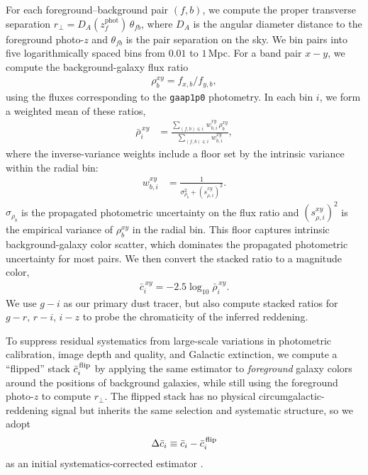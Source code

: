 \documentclass[linenumbers, twocolumn]{aastex701}
\begin{document}
For each foreground--background pair $(f, b)$, we compute the proper transverse separation $r_\perp = D_A(z_f^\text{phot})\,\theta_{fb}$, where $D_A$ is the angular diameter distance to the foreground photo-$z$ and $\theta_{fb}$ is the pair separation on the sky.
We bin pairs into five logarithmically spaced bins from $0.01$ to $1$\,Mpc.
For a band pair $x-y$, we compute the background-galaxy flux ratio
\begin{align}
    \rho_b^{xy} = f_{x,b} / f_{y,b},
\end{align}
using the fluxes corresponding to the \texttt{gaap1p0} photometry.
In each bin $i$, we form a weighted mean of these ratios,
\begin{align}
    \bar{\rho}^{\,xy}_i &=
        \frac{\sum_{(f,b) \in i}\, w^{xy}_{b,i}\,\rho_b^{xy}}{\sum_{(f,b) \in i}\, w^{xy}_{b,i}},
\end{align}
where the inverse-variance weights include a floor set by the intrinsic variance within the radial bin:
\begin{align}
    w^{xy}_{b,i} &=
        \frac{1}{\sigma^2_{\rho_b} + (s^{xy}_{\rho,i})^2}.
\end{align}
$\sigma_{\rho_b}$ is the propagated photometric uncertainty on the flux ratio and $(s^{xy}_{\rho,i})^2$ is the empirical variance of $\rho^{xy}_b$ in the radial bin.
This floor captures intrinsic background-galaxy color scatter, which dominates the propagated photometric uncertainty for most pairs.
We then convert the stacked ratio to a magnitude color,
\begin{align}
    \bar{c}^{\,xy}_i = -2.5 \log_{10} \bar{\rho}^{\,xy}_i .
\end{align}
We use $g-i$ as our primary dust tracer, but also compute stacked ratios for $g-r,\, r-i,\, i-z$ to probe the chromaticity of the inferred reddening.

To suppress residual systematics from large-scale variations in photometric calibration, image depth and quality, and Galactic extinction, we compute a ``flipped'' stack $\bar{c}^\text{\,flip}_i$ by applying the same estimator to \emph{foreground} galaxy colors around the positions of background galaxies, while still using the foreground photo-$z$ to compute $r_\perp$.
The flipped stack has no physical circumgalactic-reddening signal but inherits the same selection and systematic structure, so we adopt
\begin{align}
    \Delta \bar c_i \equiv \bar{c}_i - \bar{c}^\text{\,flip}_i
\end{align}
as an initial systematics-corrected estimator \citep[cf.][]{menard2010, peek2015}.
\end{document}
